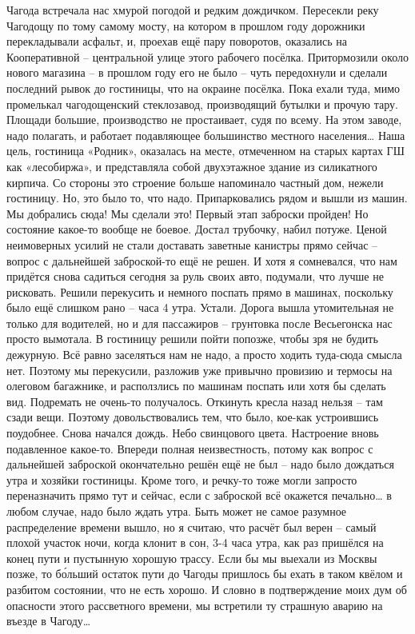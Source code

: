 Чагода встречала нас хмурой погодой и редким дождичком. Пересекли реку Чагодощу по тому самому мосту, на котором в прошлом году дорожники перекладывали асфальт, и, проехав ещё пару поворотов, оказались на Кооперативной – центральной улице этого рабочего посёлка. Притормозили около нового магазина – в прошлом году его не было – чуть передохнули и сделали последний рывок до гостиницы, что на окраине посёлка. Пока ехали туда, мимо промелькал чагодощенский стеклозавод, производящий бутылки и прочую тару. Площади большие, производство не простаивает, судя по всему. На этом заводе, надо полагать, и работает подавляющее большинство местного населения…
Наша цель, гостиница «Родник», оказалась на месте, отмеченном на старых картах ГШ как «лесобиржа», и представляла собой двухэтажное здание из силикатного кирпича. Со стороны это строение больше напоминало частный дом, нежели гостиницу. Но, это было то, что надо. Припарковались рядом и вышли из машин. Мы добрались сюда! Мы сделали это! Первый этап заброски пройден! Но состояние какое-то вообще не боевое. Достал трубочку, набил потуже. Ценой неимоверных усилий не стали доставать заветные канистры прямо сейчас – вопрос с дальнейшей заброской-то ещё не решен. И хотя я сомневался, что нам придётся снова садиться сегодня за руль своих авто, подумали, что лучше не рисковать. Решили перекусить и немного поспать прямо в машинах, поскольку было ещё слишком рано – часа 4 утра. Устали. Дорога вышла утомительная не только для водителей, но и для пассажиров – грунтовка после Весьегонска нас просто вымотала. В гостиницу решили пойти попозже, чтобы зря не будить дежурную. Всё равно заселяться нам не надо, а просто ходить туда-сюда смысла нет. Поэтому мы перекусили, разложив уже привычно провизию и термосы на олеговом багажнике, и расползлись по машинам поспать или хотя бы сделать вид. 
Подремать не очень-то получалось. Откинуть кресла назад нельзя – там сзади вещи. Поэтому довольствовались тем, что было, кое-как устроившись поудобнее. Снова начался дождь. Небо свинцового цвета. Настроение вновь подавленное какое-то. Впереди полная неизвестность, потому как вопрос с дальнейшей заброской окончательно решён ещё не был – надо было дождаться утра и хозяйки гостиницы. Кроме того, и речку-то тоже могли запросто переназначить прямо тут и сейчас, если с заброской всё окажется печально… в любом случае, надо было ждать утра. Быть может не самое разумное распределение времени вышло, но я считаю, что расчёт был верен – самый плохой участок ночи, когда клонит в сон, 3-4 часа утра, как раз пришёлся на конец пути и пустынную хорошую трассу. Если бы мы выехали из Москвы позже, то бо́льший остаток пути до Чагоды пришлось бы ехать в таком квёлом и разбитом состоянии, что не есть хорошо. И словно в подтверждение моих дум об опасности этого рассветного времени, мы встретили ту страшную аварию на въезде в Чагоду… 
